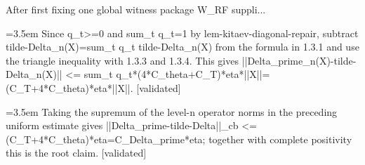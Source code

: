\documentclass{article}
\newcommand{\step}[1]{\par\noindent\hangindent=3.5em\hangafter=1%
  \makebox[3.5em][l]{\textbf{#1.}}}
\newcommand{\steptag}[1]{\hfill{\small\textsf{[#1]}}}
\begin{document}
\begin{proofbox}{After first fixing one global witness package W\_RF suppli...}
\step{1.3.5} Since q\_t>=0 and sum\_t q\_t=1 by lem-kitaev-diagonal-repair, subtract tilde-Delta\_n(X)=sum\_t q\_t tilde-Delta\_n(X) from the formula in 1.3.1 and use the triangle inequality with 1.3.3 and 1.3.4. This gives ||Delta\_prime\_n(X)-tilde-Delta\_n(X)|| <= sum\_t q\_t*(4*C\_theta+C\_T)*eta*||X||=(C\_T+4*C\_theta)*eta*||X||. \steptag{validated} \\[4pt]
\step{1.4} Taking the supremum of the level-n operator norms in the preceding uniform estimate gives ||Delta\_prime-tilde-Delta||\_cb <= (C\_T+4*C\_theta)*eta=C\_Delta\_prime*eta; together with complete positivity this is the root claim. \steptag{validated} \\[4pt]
\end{proofbox}
\end{document}
